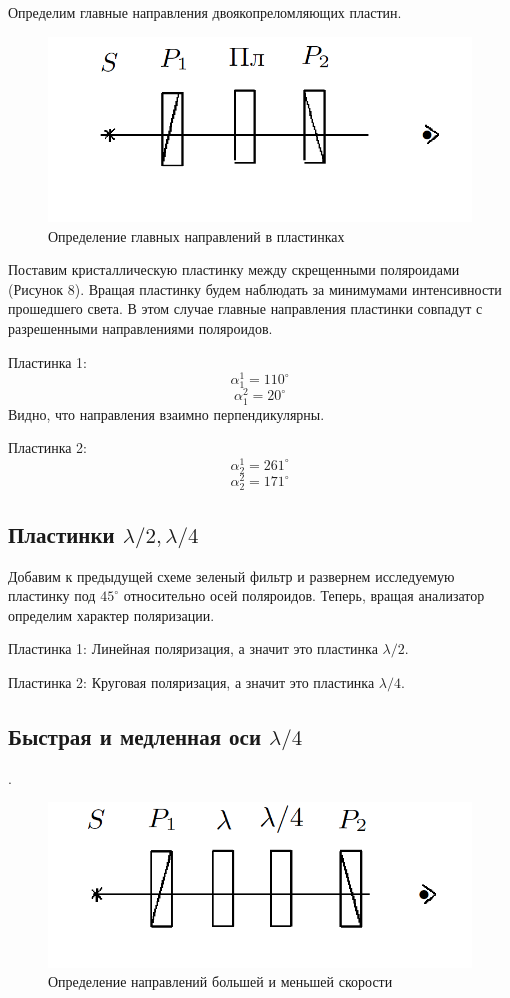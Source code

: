 \documentclass[a4paper,12pt]{article}
\begin{document}
Определим главные направления двоякопреломляющих пластин. 
\begin{figure}[h!]
    \centering
    \includegraphics[scale = 0.4]{7.png}
    \caption{Определение главных
		направлений в пластинках}
    \label{fig : 1}
\end{figure}

Поставим кристаллическую пластинку между скрещенными поляроидами (Рисунок 8). Вращая пластинку будем наблюдать за минимумами интенсивности прошедшего света. В этом случае главные направления пластинки совпадут с разрешенными направлениями поляроидов. 


	
	Пластинка 1:
	\[
		\alpha_1^1 = 110^\circ
	\]
	\[
		\alpha_1^2 = 20^\circ
	\]
	Видно, что направления взаимно перпендикулярны.
	
	Пластинка 2:
	\[
	\alpha_2^1 = 261^\circ
	\]
	\[
	\alpha_2^2 = 171^\circ
	\]


\subsection{Пластинки $ \lambda/2, \lambda/4 $}

Добавим к предыдущей схеме зеленый фильтр и развернем исследуемую пластинку под $45^\circ$ относительно осей поляроидов. Теперь, вращая анализатор определим характер поляризации.
	
	Пластинка 1: Линейная поляризация, а значит это пластинка $\lambda/2$.
	
	Пластинка 2: Круговая поляризация, а значит это пластинка $\lambda/4$.
	

\subsection{Быстрая и медленная оси $ \lambda/4 $}.


\begin{figure}[h!]
    \centering
    \includegraphics[scale = 0.4]{8.png}
    \caption{Определение направлений
большей и меньшей скорости}
    \label{fig : 1}
\end{figure}
\end{document}
